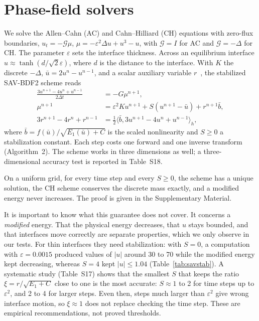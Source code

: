 \documentclass[smallextended,envcountsame]{svjour3}
\begin{document}
\section{Phase-field solvers}\label{sec:pf}
We solve the Allen--Cahn (AC) and Cahn--Hilliard (CH) equations with zero-flux boundaries,
$u_t=-\mathcal G\mu$, $\mu=-\varepsilon^2\Delta u+u^3-u$, with $\mathcal G=I$ for AC and $\mathcal G=-\Delta$
for CH. The parameter $\varepsilon$ sets the interface thickness. Across an equilibrium interface
$u\approx\tanh(d/\sqrt2\varepsilon)$, where $d$ is the distance to the interface. With $K$ the discrete
$-\Delta$, $\bar u=2u^n-u^{n-1}$, and a scalar auxiliary variable $r$~\cite{shen2018scalar}, the
stabilized SAV-BDF2 scheme reads
\begin{align}
\frac{3u^{n+1}-4u^n+u^{n-1}}{2\Delta t}&=-G\mu^{n+1},\label{eq:sav1}\\
\mu^{n+1}&=\varepsilon^2Ku^{n+1}+S(u^{n+1}-\bar u)+r^{n+1}\bar b,\label{eq:sav1b}\\
3r^{n+1}-4r^n+r^{n-1}&=\tfrac12\langle\bar b,3u^{n+1}-4u^n+u^{n-1}\rangle_h,\label{eq:sav2}
\end{align}
where $\bar b=f(\bar u)/\sqrt{E_1(\bar u)+C}$ is the scaled nonlinearity and $S\ge0$ a stabilization
constant. Each step costs one forward and one inverse transform (Algorithm~2). The scheme works in three dimensions
as well; a three-dimensional accuracy test is reported in Table~S18.

\begin{theorem}\label{thm:energy}
On a uniform grid, for every time step and every $S\ge0$, the scheme has a unique solution, the CH scheme
conserves the discrete mass exactly, and a modified energy never increases. The proof is given in the
Supplementary Material.
\end{theorem}

It is important to know what this guarantee does not cover. It concerns a \emph{modified} energy. That
the physical energy decreases, that $u$ stays bounded, and that interfaces move correctly are separate
properties, which we only observe in our tests. For thin interfaces they need stabilization: with
$S=0$, a computation with $\varepsilon=0.0015$ produced values of $|u|$ around 30 to 70 while the
modified energy kept decreasing, whereas $S=4$ kept $|u|\le1.04$ (Table~\ref{tab:savstab}). A systematic study (Table~S17) shows that the smallest $S$ that keeps the ratio $\xi=r/\sqrt{E_1+C}$
close to one is the most accurate: $S\approx1$ to 2 for time steps up to $\varepsilon^2$, and 2 to 4 for
larger steps. Even then, steps much larger than $\varepsilon^2$ give wrong interface motion, so $\xi\approx1$
does not replace checking the time step. These are empirical recommendations, not proved thresholds.
\end{document}

